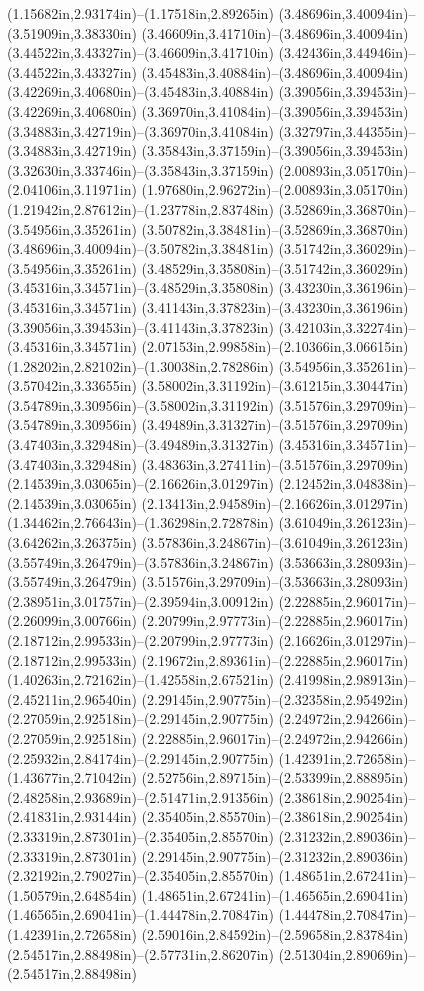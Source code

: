 (1.15682in,2.93174in)--(1.17518in,2.89265in) (3.48696in,3.40094in)--(3.51909in,3.38330in) (3.46609in,3.41710in)--(3.48696in,3.40094in) (3.44522in,3.43327in)--(3.46609in,3.41710in) (3.42436in,3.44946in)--(3.44522in,3.43327in) (3.45483in,3.40884in)--(3.48696in,3.40094in) (3.42269in,3.40680in)--(3.45483in,3.40884in) (3.39056in,3.39453in)--(3.42269in,3.40680in) (3.36970in,3.41084in)--(3.39056in,3.39453in) (3.34883in,3.42719in)--(3.36970in,3.41084in) (3.32797in,3.44355in)--(3.34883in,3.42719in) (3.35843in,3.37159in)--(3.39056in,3.39453in) (3.32630in,3.33746in)--(3.35843in,3.37159in) (2.00893in,3.05170in)--(2.04106in,3.11971in) (1.97680in,2.96272in)--(2.00893in,3.05170in) (1.21942in,2.87612in)--(1.23778in,2.83748in) (3.52869in,3.36870in)--(3.54956in,3.35261in) (3.50782in,3.38481in)--(3.52869in,3.36870in) (3.48696in,3.40094in)--(3.50782in,3.38481in) (3.51742in,3.36029in)--(3.54956in,3.35261in) (3.48529in,3.35808in)--(3.51742in,3.36029in) (3.45316in,3.34571in)--(3.48529in,3.35808in) (3.43230in,3.36196in)--(3.45316in,3.34571in) (3.41143in,3.37823in)--(3.43230in,3.36196in) (3.39056in,3.39453in)--(3.41143in,3.37823in) (3.42103in,3.32274in)--(3.45316in,3.34571in) (2.07153in,2.99858in)--(2.10366in,3.06615in) (1.28202in,2.82102in)--(1.30038in,2.78286in) (3.54956in,3.35261in)--(3.57042in,3.33655in) (3.58002in,3.31192in)--(3.61215in,3.30447in) (3.54789in,3.30956in)--(3.58002in,3.31192in) (3.51576in,3.29709in)--(3.54789in,3.30956in) (3.49489in,3.31327in)--(3.51576in,3.29709in) (3.47403in,3.32948in)--(3.49489in,3.31327in) (3.45316in,3.34571in)--(3.47403in,3.32948in) (3.48363in,3.27411in)--(3.51576in,3.29709in) (2.14539in,3.03065in)--(2.16626in,3.01297in) (2.12452in,3.04838in)--(2.14539in,3.03065in) (2.13413in,2.94589in)--(2.16626in,3.01297in) (1.34462in,2.76643in)--(1.36298in,2.72878in) (3.61049in,3.26123in)--(3.64262in,3.26375in) (3.57836in,3.24867in)--(3.61049in,3.26123in) (3.55749in,3.26479in)--(3.57836in,3.24867in) (3.53663in,3.28093in)--(3.55749in,3.26479in) (3.51576in,3.29709in)--(3.53663in,3.28093in) (2.38951in,3.01757in)--(2.39594in,3.00912in) (2.22885in,2.96017in)--(2.26099in,3.00766in) (2.20799in,2.97773in)--(2.22885in,2.96017in) (2.18712in,2.99533in)--(2.20799in,2.97773in) (2.16626in,3.01297in)--(2.18712in,2.99533in) (2.19672in,2.89361in)--(2.22885in,2.96017in) (1.40263in,2.72162in)--(1.42558in,2.67521in) (2.41998in,2.98913in)--(2.45211in,2.96540in) (2.29145in,2.90775in)--(2.32358in,2.95492in) (2.27059in,2.92518in)--(2.29145in,2.90775in) (2.24972in,2.94266in)--(2.27059in,2.92518in) (2.22885in,2.96017in)--(2.24972in,2.94266in) (2.25932in,2.84174in)--(2.29145in,2.90775in) (1.42391in,2.72658in)--(1.43677in,2.71042in) (2.52756in,2.89715in)--(2.53399in,2.88895in) (2.48258in,2.93689in)--(2.51471in,2.91356in) (2.38618in,2.90254in)--(2.41831in,2.93144in) (2.35405in,2.85570in)--(2.38618in,2.90254in) (2.33319in,2.87301in)--(2.35405in,2.85570in) (2.31232in,2.89036in)--(2.33319in,2.87301in) (2.29145in,2.90775in)--(2.31232in,2.89036in) (2.32192in,2.79027in)--(2.35405in,2.85570in) (1.48651in,2.67241in)--(1.50579in,2.64854in) (1.48651in,2.67241in)--(1.46565in,2.69041in) (1.46565in,2.69041in)--(1.44478in,2.70847in) (1.44478in,2.70847in)--(1.42391in,2.72658in) (2.59016in,2.84592in)--(2.59658in,2.83784in) (2.54517in,2.88498in)--(2.57731in,2.86207in) (2.51304in,2.89069in)--(2.54517in,2.88498in) 
